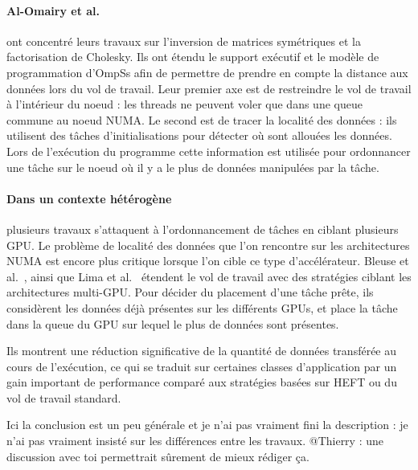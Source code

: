 \paragraph{Al-Omairy et al.~\cite{Al-Omairy2015}} ont concentré leurs travaux sur l'inversion de matrices symétriques et la factorisation de Cholesky.
Ils ont étendu le support exécutif et le modèle de programmation d'OmpSs afin de permettre de prendre en compte la distance aux données lors du vol de travail.
Leur premier axe est de restreindre le vol de travail à l'intérieur du noeud : les threads ne peuvent voler que dans une queue commune au noeud NUMA.
Le second est de tracer la localité des données : ils utilisent des tâches d'initialisations pour détecter où sont allouées les données. Lors de l'exécution du programme cette information est utilisée pour ordonnancer une tâche sur le noeud où il y a le plus de données manipulées par la tâche.




\paragraph{Dans un contexte hétérogène} plusieurs travaux s'attaquent à l'ordonnancement de tâches en ciblant plusieurs GPU.
Le problème de localité des données que l'on rencontre sur les architectures NUMA est encore plus critique lorsque l'on cible ce type d'accélérateur.
Bleuse et al.~\cite{Bleuse2014}, ainsi que Lima et al.~\cite{Lima2015} étendent le vol de travail avec des stratégies ciblant les architectures multi-GPU.
Pour décider du placement d'une tâche prête, ils considèrent les données déjà présentes sur les différents GPUs, et place la tâche dans la queue du GPU sur lequel le plus de données sont présentes.

Ils montrent une réduction significative de la quantité de données transférée au cours de l'exécution, ce qui se traduit sur certaines classes d'application par un gain important de performance comparé aux stratégies basées sur HEFT ou du vol de travail standard.

\begin{todo}
  Ici la conclusion est un peu générale et je n'ai pas vraiment fini la description : je n'ai pas vraiment insisté sur les différences entre les travaux.
  @Thierry : une discussion avec toi permettrait sûrement de mieux rédiger ça.
\end{todo}


